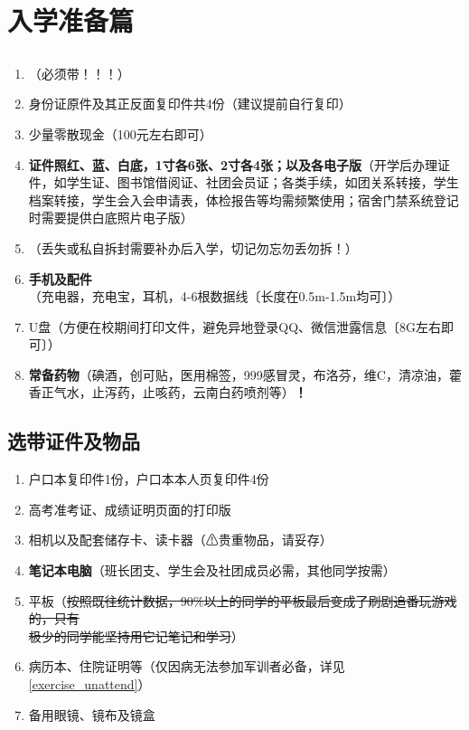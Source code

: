 \chapter[入学准备篇]{入学准备篇\vspace{-1.5em}}
\section[必要证件及物品]{}
\begin{enumerate}
    \item \textbf{}（必须带！！！）
    \item 身份证原件及其正反面复印件共4份（建议提前自行复印）
    \item 少量零散现金（100元左右即可）\footnotemark
    \item \textbf{证件照红、蓝、白底，1寸各6张、2寸各4张；以及各电子版}（开学后办理证件，如学生证、图书馆借阅证、社团会员证；各类手续，如团关系转接，学生档案转接，学生会入会申请表，体检报告等均需频繁使用；宿舍门禁系统登记时需要提供白底照片电子版）
    \item \textbf{}（丢失或私自拆封需要补办后入学，切记勿忘勿丢勿拆！）
    \item \textbf{手机及配件}（充电器，充电宝，耳机，4-6根数据线〔长度在0.5m-1.5m均可〕）
    \item U盘（方便在校期间打印文件，避免异地登录QQ、微信泄露信息〔8G左右即可〕）
    \item \textbf{常备药物}（碘酒，创可贴，医用棉签，999感冒灵，布洛芬，维C，清凉油，藿香正气水，止泻药，止咳药，云南白药喷剂等）\textbf{！}
\end{enumerate}

\section[选带证件及物品]{选带证件及物品}
\begin{enumerate}
    \item 户口本复印件1份，户口本本人页复印件4份\footnotemark
    \item 高考准考证、成绩证明页面的打印版\footnotemark
    \item 相机以及配套储存卡、读卡器（⚠贵重物品，请妥存）
    \item \textbf{笔记本电脑}（班长团支、学生会及社团成员必需，其他同学按需）
    \item 平板（\sout{按照既往统计数据，90\%以上的同学的平板最后变成了刷剧追番玩游戏的，只有\\极少的同学能坚持用它记笔记和学习}）
    \item 病历本、住院证明等（仅因病无法参加军训者必备，详见\uline{\ref{exercise_unattend}}）
    \item 备用眼镜、镜布及镜盒
\end{enumerate}

